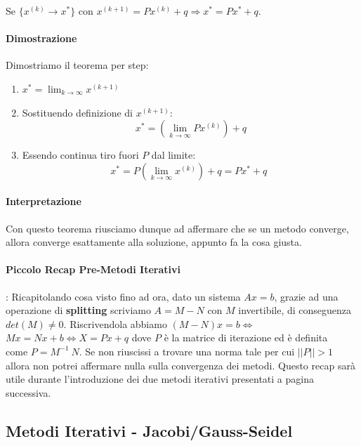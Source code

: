 \documentclass{article}
\begin{document}
Se $\{ x^{(k)} \rightarrow x^{*} \}$ con $x^{(k+1)} = Px^{(k)} + q \Rightarrow x^{*} = Px^{*} + q$.

\paragraph{Dimostrazione} Dimostriamo il teorema per step:

\begin{enumerate}
    \item $x^{*} = \lim_{k \rightarrow \infty} x^{(k+1)}$
    \item Sostituendo definizione di $x^{(k+1)}$:
    \[ x^{*} = (\lim_{k \rightarrow \infty} Px^{(k)}) + q \]
    \item Essendo continua tiro fuori $P$ dal limite:
    \[ x^{*} = P(\lim_{k \rightarrow \infty} x^{(k)}) + q = Px^{*} + q \:\: \boxed{} \]
\end{enumerate}
\vspace*{-20px}

\paragraph{Interpretazione} Con questo teorema riusciamo dunque ad affermare che se un metodo converge, allora converge
esattamente alla soluzione, appunto fa la cosa giusta.

\vspace*{-10px}

\paragraph{Piccolo Recap Pre-Metodi Iterativi}: Ricapitolando cosa visto fino ad ora, dato un sistema $Ax = b$, grazie ad una operazione di \textbf{splitting}
scriviamo $A = M - N$ con $M$ invertibile, di conseguenza $det(M) \neq 0$. Riscrivendola abbiamo $(M-N)x = b \Leftrightarrow $ \\ $Mx = Nx + b \Leftrightarrow X = Px + q$ dove $P$ è
la matrice di iterazione ed è definita \\ come $P = M^{-1}\:N$. Se non riuscissi a trovare una norma tale per cui $||P|| > 1$ allora non potrei affermare nulla sulla convergenza dei metodi. 
Questo recap sarà utile durante l'introduzione dei due metodi iterativi presentati a pagina successiva.

\newpage

\subsection{Metodi Iterativi - Jacobi/Gauss-Seidel}
\end{document}

